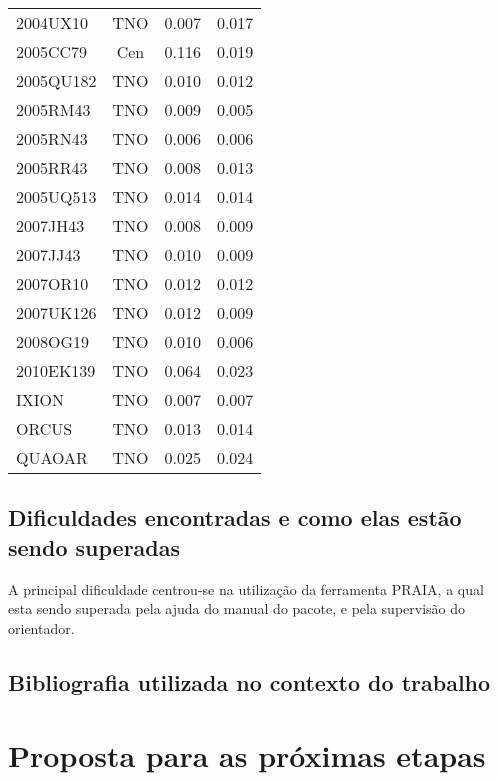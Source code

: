 \documentclass[a4paper, 11pt]{article}
\begin{document}
\begin{table}
\begin{center}
{\begin{tabular}{|l|c|c|c|}
2004UX10    &  TNO &  0.007 & 0.017 \\
2005CC79    &  Cen &  0.116 & 0.019 \\
2005QU182   &  TNO &  0.010 & 0.012 \\
2005RM43    &  TNO &  0.009 & 0.005 \\
2005RN43    &  TNO &  0.006 & 0.006 \\
2005RR43    &  TNO &  0.008 & 0.013 \\
2005UQ513   &  TNO &  0.014 & 0.014 \\
2007JH43    &  TNO &  0.008 & 0.009 \\
2007JJ43    &  TNO &  0.010 & 0.009 \\
2007OR10    &  TNO &  0.012 & 0.012 \\
2007UK126   &  TNO &  0.012 & 0.009 \\
2008OG19    &  TNO &  0.010 & 0.006 \\
2010EK139   &  TNO &  0.064 & 0.023 \\
IXION       &  TNO &  0.007 & 0.007 \\
ORCUS       &  TNO &  0.013 & 0.014 \\
QUAOAR      &  TNO &  0.025 & 0.024 \\
\hline
\end{tabular}}
\label{table:incerteza}
\end{center}
\end{table}

\subsection{Dificuldades encontradas e como elas estão sendo superadas}
A principal dificuldade centrou-se na utilização da ferramenta PRAIA, a qual esta sendo superada pela ajuda do manual do pacote, e pela supervisão do orientador.  

\subsection{Bibliografia utilizada no contexto do trabalho}

\section{Proposta para as próximas etapas}
\end{document}
